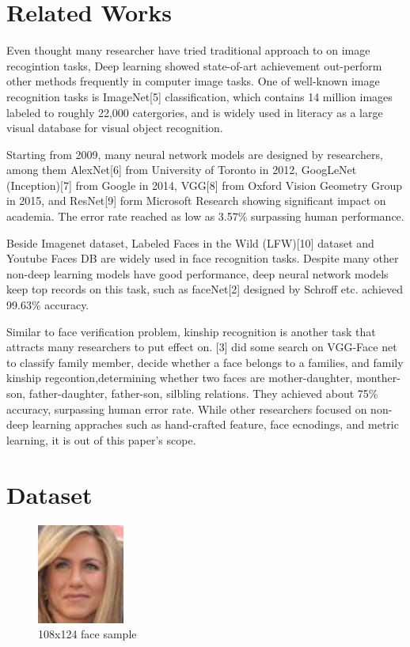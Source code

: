 \documentclass{article}
\begin{document}
\section{Related Works}

Even thought many researcher have tried traditional approach to on image
recogintion tasks, Deep learning showed state-of-art achievement out-perform
other methods frequently in computer image tasks. One of well-known image
recognition tasks is ImageNet[5] classification, which contains 14 million
images labeled to roughly 22,000 catergories, and is widely used in literacy as
a large visual database for visual object recognition.

Starting from 2009, many neural network models are designed by researchers,
among them AlexNet[6] from University of Toronto in 2012, GoogLeNet
(Inception)[7] from Google in 2014, VGG[8] from Oxford Vision Geometry Group in
2015, and ResNet[9] form Microsoft Research showing significant impact on
academia. The error rate reached as low as 3.57\% surpassing human performance.

Beside Imagenet dataset, Labeled Faces in the Wild (LFW)[10] dataset and
Youtube Faces DB are widely used in face recognition tasks. Despite many other
non-deep learning models have good performance, deep neural network models keep
top records on this task, such as faceNet[2] designed by Schroff etc. achieved
99.63\% accuracy.

Similar to face verification problem, kinship recognition is another task that
attracts many researchers to put effect on.  [3] did some search on VGG-Face
net to classify family member,  decide whether a face belongs to a families,
and family kinship regcontion,determining whether two faces are
mother-daughter, monther-son, father-daughter, father-son, silbling relations.
They achieved about 75\% accuracy, surpassing human error rate.  While other
researchers focused on non-deep learning appraches such as hand-crafted
feature, face ecnodings, and metric learning, it is out of this paper's scope.

\section{Dataset}

\begin{figure}
\caption{108x124 face sample}
\includegraphics{img/P00241_face0}
\end{figure}
\end{document}
